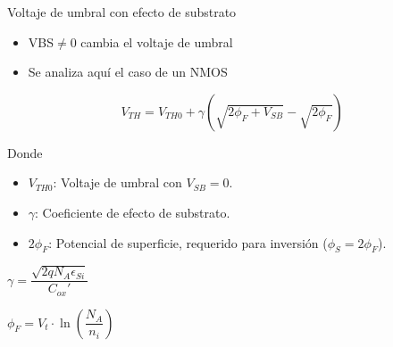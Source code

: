 \documentclass[t,aspectratio=169]{beamer}
\begin{document}
\begin{frame}{Voltaje de umbral con efecto de substrato}
\begin{itemize}
	\item VBS$\neq$0 cambia el voltaje de umbral
	\item Se analiza aquí el caso de un NMOS
\end{itemize}

\[ V_{TH} = V_{TH0} + \gamma (\sqrt{2 \phi_F + V_{SB}} - \sqrt{ 2 \phi_F }) \]

Donde

\begin{itemize}
    \item $V_{TH0}$: Voltaje de umbral con $V_{SB} = 0$.
    \item $\gamma$: Coeficiente de efecto de substrato.
    \item $2\phi_{F}$: Potencial de superficie, requerido para inversión ($\phi_S = 2\phi_F$).
\end{itemize}

\vspace{5mm}\centering
$\gamma = \dfrac{\sqrt{2 q N_A \epsilon_{Si}}}{C_{ox}'}$

$\phi_F = V_t \cdot \ln \left( \dfrac{N_A}{n_i} \right)$

\end{frame}
\end{document}
